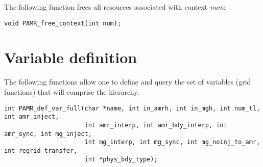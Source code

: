\documentclass[aps,amssymb,unsortedaddress,nofootinbib]{revtex4}
\begin{document}
\noindent 
The following function frees all resources associated with context {\em num}:


\begin{verbatim}
void PAMR_free_context(int num);
\end{verbatim}


\section{Variable definition}
The following functions allow one to define and query the set of variables (grid functions)
that will comprise the hierarchy.


\begin{verbatim}
int PAMR_def_var_full(char *name, int in_amrh, int in_mgh, int num_tl, int amr_inject,
                      int amr_interp, int amr_bdy_interp, int amr_sync, int mg_inject, 
                      int mg_interp, int mg_sync, int mg_noinj_to_amr, int regrid_transfer, 
                      int *phys_bdy_type);
\end{verbatim}
\end{document}
